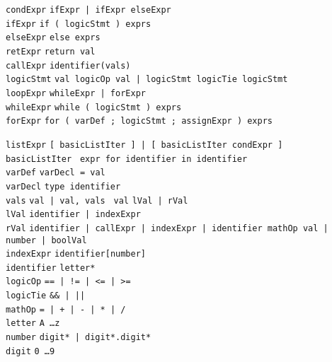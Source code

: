 \documentclass{article}
\newcommand{\keyword}[1]{\colorbox{light-gray}{\texttt{#1}}}
\newcommand{\code}[1]{\texttt{#1}}
\begin{document}
\code{condExpr} \textrightarrow \code{ifExpr | ifExpr elseExpr} \\
\code{ifExpr} \textrightarrow \code{\keyword{if (} logicStmt \keyword{)} exprs } \\
\code{elseExpr} \textrightarrow \code{\keyword{else} exprs} \\
\code{retExpr} \textrightarrow \code{\keyword{return} val} \\
\code{callExpr} \textrightarrow \code{identifier\keyword{(}vals\keyword{)}} \\
\code{logicStmt} \textrightarrow \code{val logicOp val | logicStmt logicTie logicStmt} \\

\code{loopExpr} \textrightarrow \code{whileExpr | forExpr} \\
\code{whileExpr} \textrightarrow \code{\keyword{while (} logicStmt \keyword{)} exprs} \\
\code{forExpr} \textrightarrow \code{\keyword{for (} varDef \keyword{;} logicStmt \keyword{;} assignExpr \keyword{)} exprs}

\code{listExpr} \textrightarrow \code{\keyword{[} basicListIter \keyword{]} | \keyword{[} basicListIter condExpr \keyword{]} } \\
\code{basicListIter} \textrightarrow \code{ expr \keyword{for} identifier \keyword{in} identifier} \\

\code{varDef} \textrightarrow \code{varDecl \keyword{=} val} \\
\code{varDecl} \textrightarrow \code{type identifier} \\
\code{vals} \textrightarrow \code{val | val, vals }
\code{val} \textrightarrow \code{lVal | rVal} \\
\code{lVal} \textrightarrow \code{identifier | indexExpr} \\
\code{rVal} \textrightarrow \code{identifier | callExpr | indexExpr | identifier mathOp val | number | boolVal} \\
\code{indexExpr} \textrightarrow \code{identifier\keyword{[}number\keyword{]}} \\

\code{identifier} \textrightarrow \code{letter*} \\
\code{logicOp} \textrightarrow \code{\keyword{==} | \keyword{!=} | \keyword{<=} | \keyword{>=}} \\
\code{logicTie} \textrightarrow \code{\keyword{\&\&} | \keyword{||}} \\
\code{mathOp} \textrightarrow \code{\keyword{=} | \keyword{+} | \keyword{-} | \keyword{*} | \keyword{/}} \\
\code{letter} \textrightarrow \code{\keyword{A} \ldots \keyword{z}} \\
\code{number} \textrightarrow \code{digit* | digit*.digit*} \\
\code{digit} \textrightarrow \code{\keyword{0} \ldots \keyword{9}} \\
\end{document}
